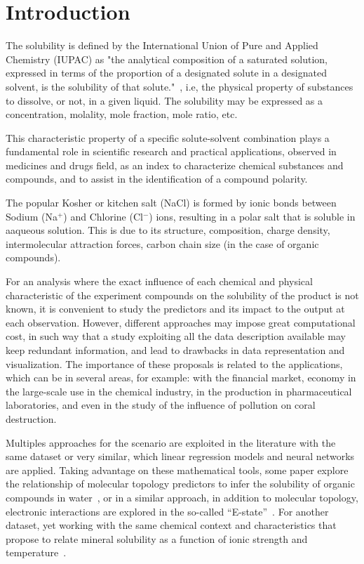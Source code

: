 \section{Introduction}

The solubility is defined by the International Union of Pure and Applied Chemistry (IUPAC) as "the analytical composition of a saturated solution, expressed in terms of the proportion of a designated solute in a designated solvent, is the solubility of that solute."~\cite{Book1}, i.e, the physical property of substances to dissolve, or not, in a given liquid. The solubility may be expressed as a concentration, molality, mole fraction, mole ratio, etc. 

This characteristic property of a specific solute-solvent combination plays a fundamental role in scientific research and practical applications, observed in medicines and drugs field, as an index to characterize chemical substances and compounds, and to assist in the identification of a compound polarity.

The popular Kosher or kitchen salt (NaCl) is formed by ionic bonds between Sodium (Na$^+$) and Chlorine (Cl$^-$) ions, resulting in a polar salt that is soluble in aaqueous solution. This is due to its structure, composition, charge density, intermolecular attraction forces, carbon chain size (in the case of organic compounds).

For an analysis where the exact influence of each chemical and physical characteristic of the experiment compounds on the solubility of the product is not known, it is convenient to study the predictors and its impact to the output at each observation. However, different approaches may impose great computational cost, in such way that a study exploiting all the data description available may keep redundant information, and lead to drawbacks in data representation and visualization. The importance of these proposals is related to the applications, which can be in several areas, for example: with the financial market, economy in the large-scale use in the chemical industry, in the production in pharmaceutical laboratories, and even in the study of the influence of pollution on coral destruction.

Multiples approaches for the scenario are exploited in the literature with the same dataset or very similar, which linear regression models and neural networks are applied. Taking advantage on these mathematical tools, some paper explore the relationship of molecular topology predictors to infer the solubility of organic compounds in water~\cite{Artigo1}, or in a similar approach, in addition to molecular topology, electronic interactions are explored in the so-called ``E-state''~\cite{Artigo2}. For another dataset, yet working with the same chemical context and characteristics that propose to relate mineral solubility as a function of ionic strength and temperature~\cite{Artigo3}. 

